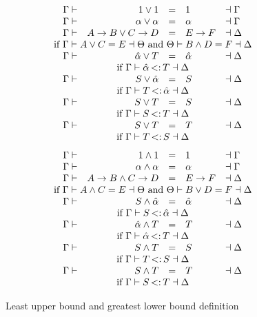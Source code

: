 \documentclass{sig-alternate}
\newcommand{\st}{\ensuremath{\hspace{-1px}<:\hspace{-1px}}}
\newcommand{\alphahat}{\hat{\alpha}}
\newcommand{\lub}{\ensuremath{\vee}}
\newcommand{\glb}{\ensuremath{\wedge}}
\begin{document}
\begin{figure}
\[
\begin{array}{llrcll}
\;&\Gamma \vdash& 1 \lub 1 &=& 1 &\dashv \Gamma\\
&\Gamma \vdash& \alpha \lub \alpha &=& \alpha &\dashv \Gamma\\
&\Gamma \vdash& A\rightarrow B \lub C\rightarrow D &=& E\rightarrow F &\dashv \Delta\\
\multicolumn{6}{c}{\text{ if } \Gamma \vdash A \lub C = E \dashv \Theta \text{ and } \Theta \vdash B \glb D = F \dashv \Delta}\\
&\Gamma \vdash& \alphahat \lub T &=& \alphahat &\dashv \Delta\\
\multicolumn{6}{c}{\text{ if } \Gamma \vdash \alphahat \st T \dashv \Delta}\\
&\Gamma \vdash& S \lub \alphahat &=& S &\dashv \Delta \\
\multicolumn{6}{c}{\text{ if } \Gamma \vdash T \st \alphahat \dashv \Delta}\\
&\Gamma \vdash& S \lub T &=& S &\dashv \Delta\\
\multicolumn{6}{c}{\text{ if } \Gamma \vdash S \st T \dashv \Delta}\\
&\Gamma \vdash& S \lub T &=& T &\dashv \Delta \\
\multicolumn{6}{c}{\text{ if } \Gamma \vdash T \st S \dashv \Delta}\\
\end{array}
\]
\[
\begin{array}{llrcll}
\;&\Gamma \vdash& 1 \glb 1 &=& 1 &\dashv \Gamma\\
&\Gamma \vdash& \alpha \glb \alpha &=& \alpha &\dashv \Gamma\\
&\Gamma \vdash& A\rightarrow B \glb C\rightarrow D &=& E\rightarrow F &\dashv \Delta\\
\multicolumn{6}{c}{\text{ if } \Gamma \vdash A \glb C = E \dashv \Theta \text{ and } \Theta \vdash B \lub D = F \dashv \Delta}\\
&\Gamma \vdash& S \glb \alphahat &=& \alphahat &\dashv \Delta \\
\multicolumn{6}{c}{\text{ if } \Gamma \vdash S \st \alphahat \dashv \Delta}\\
&\Gamma \vdash& \alphahat \glb T &=& T &\dashv \Delta\\
\multicolumn{6}{c}{\text{ if } \Gamma \vdash \alphahat \st T \dashv \Delta}\\
&\Gamma \vdash& S \glb T &=& S &\dashv \Delta \\
\multicolumn{6}{c}{\text{ if } \Gamma \vdash T \st S \dashv \Delta}\\
&\Gamma \vdash& S \glb T &=& T &\dashv \Delta\\
\multicolumn{6}{c}{\text{ if } \Gamma \vdash S \st T \dashv \Delta}\\
\end{array}
\]
\caption{Least upper bound and greatest lower bound definition}
\label{fig:bounds}
\end{figure} 
\end{document}
